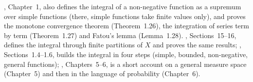 
\furtherreading
\textcite{rudin-rca}, Chapter~1, also defines the integral of a non-negative function as a
supremum over simple functions (there, simple functions take finite values only), and proves the monotone convergence theorem (Theorem~1.26),
the integration of series term by term (Theorem~1.27) and Fatou's lemma (Lemma~1.28).
\textcite{billingsley}, Sections~15--16, defines the integral through finite partitions of $X$ and
proves the same results; \textcite{durrett}, Sections~1.4--1.6, builds the integral in four steps
(simple, bounded, non-negative, general functions); \textcite{williams}, Chapters~5--6, is a short
account on a general measure space (Chapter~5) and then in the language of probability
(Chapter~6).
